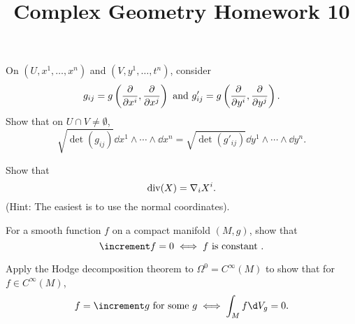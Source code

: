 \documentclass[12pt]{article}
\title{Complex Geometry Homework 10}
\author{}
\date{}
\begin{document}
\maketitle
\begin{problem}
  On \((U,x^1,\ldots,x^n)\) and \((V,y^1,\ldots,t^n)\), consider \[
    g_{ij}=g\left(\pdv{}{x^i},\pdv{}{x^j}\right)\text{ and }g_{ij}'
    =g\left(\pdv{}{y^i},\pdv{}{y^j}\right)
  .\] Show that on \(U\cap V\neq \emptyset\), \[
    \sqrt{\det(g_{ij})}\dd{x^1}\wedge \cdots \wedge \dd{x^n}
    = \sqrt{\det(g'_{ij})}\dd{y^1}\wedge \cdots \wedge \dd{y^n}
  .\] 
\end{problem}
\begin{problem}
  Show that \[
    \operatorname{div}(X)=\nabla_i X^i
  .\] (Hint: The easiest is to use the normal coordinates).
\end{problem}
\begin{problem}
  For a smooth function \(f\) on a compact manifold \((M,g)\), show that \[
    \lap f=0\iff f\text{ is constant }
  .\] 
\end{problem}
\begin{problem}
  Apply the Hodge decomposition theorem to \(\Omega^0=C^\infty(M)\) to show that
  for \(f\in C^\infty(M)\), \[
    f=\lap g\text{ for some }g\iff \int_{M}f\dd{V_g}=0
  .\]
\end{problem}
\end{document}
